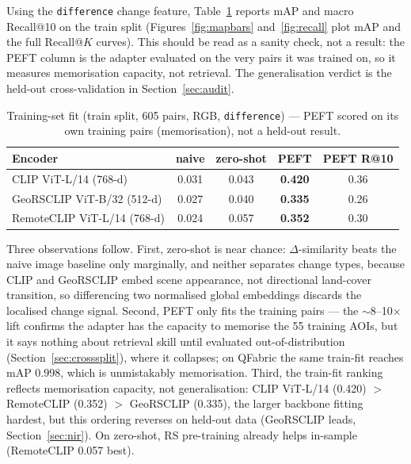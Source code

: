 \documentclass{article}
\begin{document}
Using the \texttt{difference} change feature, Table~\ref{tab:indist} reports mAP
and macro Recall@10 on the train split (Figures~\ref{fig:mapbars}
and~\ref{fig:recall} plot mAP and the full Recall@$K$ curves). This should be read as a sanity check, not
a result: the PEFT column is the adapter evaluated on the very pairs it was
trained on, so it measures memorisation capacity, not retrieval. The
generalisation verdict is the held-out cross-validation in Section~\ref{sec:audit}.

\begin{table}[H]
    \centering
    \caption{Training-set fit (train split, 605 pairs, RGB, \texttt{difference}) ---
    PEFT scored on its own training pairs (memorisation), not a held-out result.}
    \label{tab:indist}
    \begin{tabular}{lcccc}
        \toprule
        \textbf{Encoder} & \textbf{naive} & \textbf{zero-shot} & \textbf{PEFT} & \textbf{PEFT R@10} \\
        \midrule
        CLIP ViT-L/14 (768-d)       & 0.031 & 0.043 & \textbf{0.420} & 0.36 \\
        GeoRSCLIP ViT-B/32 (512-d)  & 0.027 & 0.040 & \textbf{0.335} & 0.26 \\
        RemoteCLIP ViT-L/14 (768-d) & 0.024 & 0.057 & \textbf{0.352} & 0.30 \\
        \bottomrule
    \end{tabular}
\end{table}

Three observations follow. First, zero-shot is near chance: $\Delta$-similarity
beats the naive image baseline only marginally, and neither separates change
types, because CLIP and GeoRSCLIP embed scene appearance, not directional
land-cover transition, so differencing two normalised global embeddings discards
the localised change signal. Second, PEFT only fits the training pairs --- the
$\sim$8--10$\times$ lift confirms the adapter has the capacity to memorise the 55
training AOIs, but it says nothing about retrieval skill until evaluated
out-of-distribution (Section~\ref{sec:crosssplit}), where it collapses; on
QFabric the same train-fit reaches mAP 0.998, which is unmistakably
memorisation. Third,
the train-fit ranking reflects memorisation capacity, not generalisation: CLIP
ViT-L/14 (0.420) $>$ RemoteCLIP (0.352) $>$ GeoRSCLIP (0.335), the larger
backbone fitting hardest, but this ordering reverses on held-out data (GeoRSCLIP
leads, Section~\ref{sec:nir}). On zero-shot, RS pre-training already helps
in-sample (RemoteCLIP 0.057 best).
\end{document}
